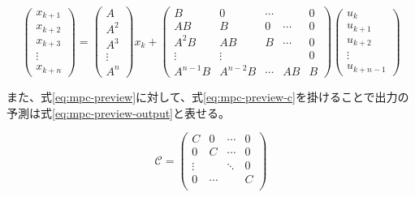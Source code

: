 \begin{equation}
  \begin{pmatrix}
    x_{k+1} \\x_{k+2}\\x_{k+3}\\
    \vdots  \\ x_{k+n}
  \end{pmatrix}
  =
  \begin{pmatrix}
    A      \\A^2\\A^3\\
    \vdots \\ A^n
  \end{pmatrix}
  x_{k} +
  \begin{pmatrix}
    B        & 0        & \cdots &        & 0 \\
    AB       & B        & 0      & \cdots & 0 \\
    A^2B     & AB       & B      & \cdots & 0 \\
    \vdots   & \vdots   &        &        & 0 \\
    A^{n-1}B & A^{n-2}B & \cdots & AB     & B
  \end{pmatrix}
  \begin{pmatrix}
    u_{k}   \\
    u_{k+1} \\
    u_{k+2} \\
    \vdots  \\
    u_{k+n-1}
  \end{pmatrix}
  \label{eq:mpc-preview}
\end{equation}

また、式\eqref{eq:mpc-preview}に対して、式\eqref{eq:mpc-preview-c}を掛けることで出力の予測は式\eqref{eq:mpc-preview-output}と表せる。

\begin{equation}
  \mathcal{C} =
  \begin{pmatrix}
    C      & 0 & \cdots & 0 \\
    0      & C & \cdots & 0 \\
    \vdots &   &    \ddots  & 0 \\
    0 & \cdots & & C\\
  \end{pmatrix}
  \label{eq:mpc-preview-c}
\end{equation}


